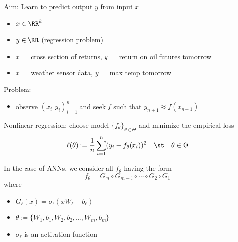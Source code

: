 \begin{frame}
    
    Aim: Learn to predict output $y$ from input $x$
    \begin{itemize}
        \item $x \in \RR^k$
        \vspace{0.5em}
        \item $y \in \RR$  (regression problem)
    \end{itemize}

    \Egs
    \begin{itemize}
        \item $x = $ cross section of returns, $y = $ return on oil futures tomorrow
        \vspace{0.5em}
        \item $x = $ weather sensor data, $y = $ max temp tomorrow
    \end{itemize}
        \vspace{0.5em}
        \vspace{0.5em}

    Problem:

    \begin{itemize}
        \item observe $(x_i, y_i)_{i=1}^n$ and seek $f$ such that $y_{n+1}
            \approx f(x_{n+1})$
    \end{itemize}


\end{frame}



\begin{frame}

    Nonlinear regression: choose model $\{f_\theta\}_{\theta \in \Theta}$ and minimize the empirical loss
    \begin{equation*}
        \ell(\theta) := \frac{1}{n}\sum_{i=1}^n (y_i - f_\theta(x_i))^2
        \quad \st \quad \theta \in \Theta
    \end{equation*}


    \pause
    \vspace{0.5em}
    In the case of ANNs, we consider all $f_\theta$ having the form
    \begin{equation*}
        f_\theta
        = G_{m} \circ G_{m-1} \circ \cdots \circ G_{2}  \circ G_{1}
    \end{equation*}
    where
    \begin{itemize}
        \item $G_{\ell} (x) = \sigma_\ell(x W_\ell + b_\ell)$ 
        \vspace{0.5em}
        \item $\theta := \{W_1, b_1, W_2, b_2, \ldots, W_m, b_m\}$
        \vspace{0.5em}
        \item $\sigma_\ell$ is an activation function
    \end{itemize}

\end{frame}

